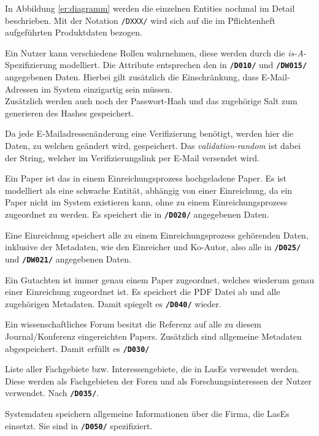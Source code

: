 In Abbildung \ref{er:diagramm} werden die einzelnen Entities nochmal im Detail beschrieben. Mit der Notation \texttt{/DXXX/} wird sich auf die im Pflichtenheft aufgeführten Produktdaten bezogen.

\begin{description}
	 Ein Nutzer kann verschiedene Rollen wahrnehmen, diese werden durch die \emph{is-A}-Spezifizierung modelliert. Die Attribute entsprechen den in \texttt{\textbf{/D010/}} und \texttt{\textbf{/DW015/}} angegebenen Daten. Hierbei gilt zusätzlich die Einschränkung, dass E-Mail-Adressen im System einzigartig sein müssen. \\Zusätzlich werden auch noch der Passwort-Hash und das zugehörige Salt zum generieren des Hashes gespeichert.

	 Da jede E-Mailadressenänderung eine Verifizierung benötigt, werden hier die Daten, zu welchen geändert wird, gespeichert. Das \emph{validation-random} ist dabei der String, welcher im Verifizierungslink per E-Mail versendet wird.

	 Ein Paper ist das in einem Einreichungsprozess hochgeladene Paper. Es ist modelliert als eine schwache Entität, abhängig von einer Einreichung, da ein Paper nicht im System existieren kann, ohne zu einem Einreichungsprozess zugeordnet zu werden. Es speichert die in \texttt{\textbf{/D020/}} angegebenen Daten.

	 Eine Einreichung speichert alle zu einem Einreichungsprozess gehörenden Daten, inklusive der Metadaten, wie den Einreicher und Ko-Autor, also alle in \texttt{\textbf{/D025/}} und \texttt{\textbf{/DW021/}} angegebenen Daten.

	 Ein Gutachten ist immer genau einem Paper zugeordnet, welches wiederum genau einer Einreichung zugeordnet ist. Es speichert die PDF Datei ab und alle zugehörigen Metadaten.
	Damit spiegelt es \texttt{\textbf{/D040/}} wieder.

	 Ein wissenschaftliches Forum besitzt die Referenz auf alle zu diesem Journal/Konferenz eingereichten Papers. Zusätzlich sind allgemeine Metadaten abgespeichert. Damit erfüllt es \texttt{\textbf{/D030/}}

	 Liste aller Fachgebiete bzw. Interessengebiete, die in LasEs verwendet werden. Diese werden als Fachgebieten der Foren und als Forschungsinteressen der Nutzer verwendet. Nach \texttt{\textbf{/D035/}}.

	 Systemdaten speichern allgemeine Informationen über die Firma, die LasEs einsetzt. Sie sind in \texttt{\textbf{/D050/}} spezifiziert.

\end{description}

